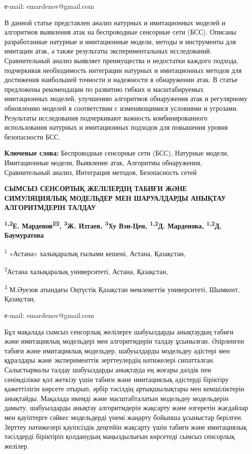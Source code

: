 е-mail: emardenov@gmail.com

В данной статье представлен анализ натурных и имитационных моделей и
алгоритмов выявления атак на беспроводные сенсорные сети (БСС). Описаны
разработанные натурные и имитационные модели, методы и инструменты для
имитации атак, а также результаты экспериментальных исследований.
Сравнительный анализ выявляет преимущества и недостатки каждого подхода,
подчеркивая необходимость интеграции натурных и имитационных методов для
достижения наибольшей точности и надежности в обнаружении атак. В статье
предложены рекомендации по развитию гибких и масштабируемых имитационных
моделей, улучшению алгоритмов обнаружения атак и регулярному обновлению
моделей в соответствии с изменяющимися условиями и угрозами. Результаты
исследования подчеркивают важность комбинированного использования
натурных и имитационных подходов для повышения уровня безопасности БСС.

{\bfseries Ключевые слова:} Беспроводные сенсорные сети (БСС), Натурные
модели, Имитационные модели, Выявление атак, Алгоритмы обнаружения,
Сравнительный анализ, Интеграция методов, Безопасность сетей

{\bfseries СЫМСЫЗ СЕНСОРЛЫҚ ЖЕЛІЛЕРДІҢ ТАБИҒИ ЖӘНЕ СИМУЛЯЦИЯЛЫҚ МОДЕЛЬДЕР
МЕН ШАРУАЛДАРДЫ АНЫҚТАУ АЛГОРИТМДЕРІН ТАЛДАУ}

{\bfseries \textsuperscript{1,2}Е. Марденов\textsuperscript{🖂},
\textsuperscript{3}Ж. Изтаев, \textsuperscript{3}Ху Вэн-Цен,
\textsuperscript{1,2}Д. Марденова, \textsuperscript{1,2}Д. Баумуратова}

\textsuperscript{1} «Астана» халықаралық ғылыми кешені, Астана,
Қазақстан,

\textsuperscript{2}Астана халықаралық университеті, Астана, Қазақстан,

\textsuperscript{3} М.Әуезов атындағы Оңтүстік Қазақстан мемлекеттік
университеті, Шымкент, Қазақстан,

е-mail: emardenov@gmail.com

Бұл мақалада сымсыз сенсорлық желілерге шабуылдарды анықтаудың табиғи
және имитациялық модельдері мен алгоритмдерін талдау ұсынылған.
Әзірленген табиғи және имитациялық модельдер, шабуылдарды модельдеу
әдістері мен құралдары және эксперименттік зерттеулердің нәтижелері
сипатталған. Салыстырмалы талдау шабуылдарды анықтауда ең жоғары дәлдік
пен сенімділікке қол жеткізу үшін табиғи және имитациялық әдістерді
біріктіру қажеттілігін көрсете отырып, әрбір тәсілдің артықшылықтары мен
кемшіліктерін анықтайды. Мақалада икемді және масштабталатын модельдеу
модельдерін дамыту, шабуылдарды анықтау алгоритмдерін жақсарту және
өзгеретін жағдайлар мен қауіптерге сәйкес модельдерді үнемі жаңарту
бойынша ұсыныстар берілген. Зерттеу нәтижелері қауіпсіздік деңгейін
жақсарту үшін табиғи және имитациялық тәсілдерді біріктіріп қолданудың
маңыздылығын көрсетеді сымсыз сенсорлық желілер.

